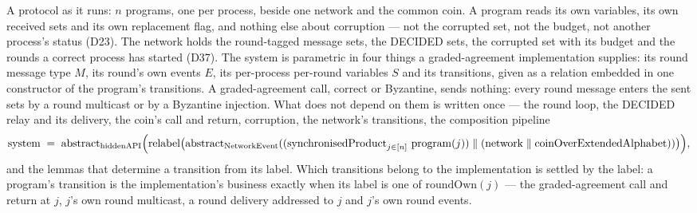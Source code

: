 \begin{definition}
  \label{def:aba-implementation}
  \leanok
  A protocol as it runs: $n$ programs, one per process, beside one network and the common coin.
  A program reads its own variables, its own received sets and its own replacement flag, and nothing else about corruption --- not the corrupted set, not the budget, not another process's status (D23).
  The network holds the round-tagged message sets, the DECIDED sets, the corrupted set with its budget and the rounds a correct process has started (D37).
  The system is parametric in four things a graded-agreement implementation supplies: its round message type $M$, its round's own events $E$, its per-process per-round variables $S$ and its transitions, given as a relation embedded in one constructor of the program's transitions.
  A graded-agreement call, correct or Byzantine, sends nothing: every round message enters the sent sets by a round multicast or by a Byzantine injection.
  What does not depend on them is written once --- the round loop, the DECIDED relay and its delivery, the coin's call and return, corruption, the network's transitions, the composition pipeline
  \[
    \mathrm{system} \;=\;
      \mathrm{abstract}_{\mathrm{hiddenAPI}}\Bigl(
        \mathrm{relabel}\bigl(\mathrm{abstract}_{\mathrm{NetworkEvent}}(
          (\mathrm{synchronisedProduct}_{j \in [n]}\ \mathrm{program}(j)) \parallel (\mathrm{network} \parallel \mathrm{coinOverExtendedAlphabet}))\bigr)\Bigr),
  \]
  and the lemmas that determine a transition from its label.
  Which transitions belong to the implementation is settled by the label: a program's transition is the implementation's business exactly when its label is one of $\mathrm{roundOwn}(j)$ --- the graded-agreement call and return at $j$, $j$'s own round multicast, a round delivery addressed to $j$ and $j$'s own round events.


\end{definition}
